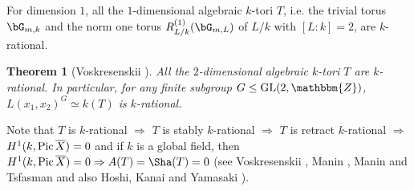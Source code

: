 \documentclass{amsart}
\theoremstyle{plain}
\newtheorem{theorem}{Theorem}[section]
\theoremstyle{definition}
\theoremstyle{remark}
\newcommand{\bZ}{\mathbbm{Z}}\newcommand{\bQ}{\mathbbm{Q}}
\newcommand{\GL}{{\rm GL}}\newcommand{\SL}{{\rm SL}}
\newcounter{sub}\def\tr{\mbox{tr }}
\begin{document}
For dimension $1$, 
all the $1$-dimensional algebraic $k$-tori $T$, 
i.e. the trivial torus $\bG_{m,k}$ 
and the norm one torus $R_{L/k}^{(1)}(\bG_{m,L})$ of $L/k$ 
with $[L:k]=2$, are $k$-rational. 
%
\begin{theorem}[{Voskresenskii \cite{Vos67}}]\label{thVo}
All the $2$-dimensional algebraic $k$-tori $T$ are $k$-rational. 
In particular, for any finite subgroup $G\leq \GL(2,\bZ)$, 
$L(x_1,x_2)^G\simeq k(T)$ is $k$-rational. 
\end{theorem}
Note that $T$ is $k$-rational $\Rightarrow$ 
$T$ is stably $k$-rational $\Rightarrow$ $T$ is retract $k$-rational 
$\Rightarrow$ $H^1(k,{\rm Pic}\,\overline{X})=0$ 
and if $k$ is a global field, then 
$H^1(k,{\rm Pic}\,\overline{X})=0\Rightarrow A(T)=\Sha(T)=0$ 
(see Voskresenskii \cite[Theorem 5, page 1213]{Vos69}, 
Manin \cite[Section 30]{Man74}, Manin and Tsfasman \cite{MT86} 
and also Hoshi, Kanai and Yamasaki \cite[Section 1]{HKY22}). 
\end{document}

